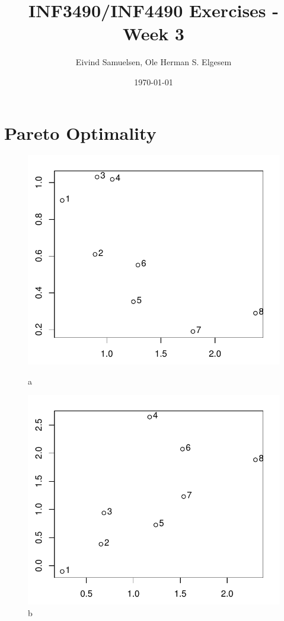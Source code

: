 \documentclass{article}           %
\title{\vspace{-2cm}INF3490/INF4490 Exercises - Week 3}
\author{Eivind Samuelsen, Ole Herman S. Elgesem}
\date{\today}
\newcommand\marginsymbol[1][0pt]{%
  \tabto*{0cm}\makebox[\dimexpr-1cm-#1\relax][r]{$\mathbb{P}$}\tabto*{\TabPrevPos}}
\begin{document}
    \renewcommand\marginsymbol[1][0pt]{%
  \tabto*{0cm}\makebox[-1cm][c]{$\mathbb{P}$}\tabto*{\TabPrevPos}}

\maketitle


\section{Pareto Optimality}
\begin{figure}[H]
  \centering
  \begin{minipage}[b]{0.45\textwidth}
    \includegraphics[width=\textwidth]{front_points_1.pdf}
    \caption{a}
  \end{minipage}
  \hfill
  \begin{minipage}[b]{0.45\textwidth}
    \includegraphics[width=\textwidth]{front_points_2.pdf}
    \caption{b}
  \end{minipage}
\end{figure}
\end{document}
